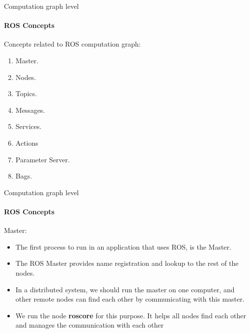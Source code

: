\documentclass{beamer}
\begin{document}
\begin{frame}{Computation graph level}
    \framesubtitle{ROS Concepts}
    
    Concepts related to ROS computation graph:
    
    \begin{enumerate}
        \item  Master.
        \item  Nodes.
        \item Topics.
        \item Messages.
        \item Services.
        \item Actions
        \item Parameter Server.
        \item Bags.
    \end{enumerate}
\end{frame}
\begin{frame}{Computation graph level}
    \framesubtitle{ROS Concepts}
    {\huge Master:}
    \vspace{1cm}
    \begin{itemize}
    
        \item The first process to run in an application that uses ROS, is the Master.
        
        \item The ROS Master provides name registration and lookup to the rest
        of the nodes.
        
        \item In a distributed system, we should run the master on one computer,
        and other remote nodes can find each other by communicating with
        this master.
        
        \item We run the node \textbf{roscore} for this purpose. It helps all nodes find each other and manages the communication with each other 
    \end{itemize}
\end{frame}
\end{document}
